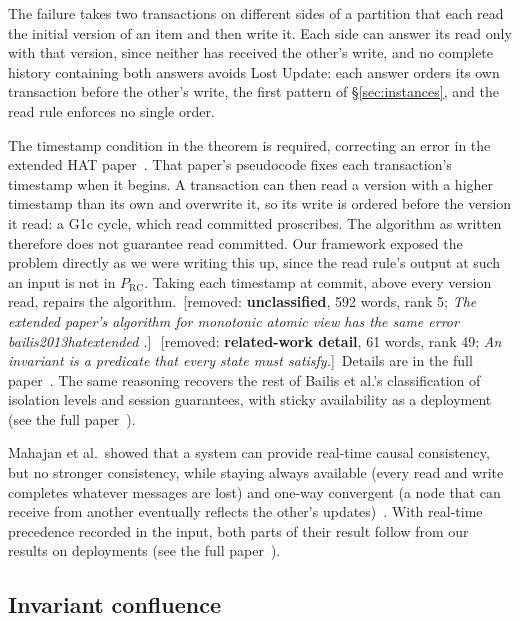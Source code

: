 \documentclass[sigconf]{cidr-2027}
\theoremstyle{remark}
\newcommand{\extended}{the full paper~\cite{hellerstein2026completecalmfull}}
\newcommand{\removednote}[1]{{\color{cutred}\footnotesize\,[removed: #1]\,}}
\begin{document}
\textcolor{newblue}{The failure takes two transactions on different sides of a partition that
each read the initial version of an item and then write it.} \textcolor{newblue}{Each side can
answer its read only with that version, since neither has received the
other's write, and no complete history containing both answers avoids Lost
Update: each answer orders its own transaction before the other's write, the
first pattern of \S\ref{sec:instances}, and the read rule enforces no single
order.}

The timestamp condition in the theorem is required, correcting an error in
the extended HAT paper~\cite{bailis2013hatextended}. That paper's pseudocode
fixes each transaction's timestamp when it begins. A transaction can then read
a version with a higher timestamp than its own and overwrite it, so its write
is ordered before the version it read: a G1c cycle, which read committed
proscribes. The algorithm as written therefore does not guarantee read
committed. Our framework exposed the problem directly as we were writing this
up, since the read rule's output at such an input is not in $P_{\mathrm{RC}}$. Taking each timestamp at commit, above every version read, repairs the
algorithm. \removednote{\textbf{unclassified}, 592 words, rank 5; \textit{The extended paper's algorithm for monotonic atomic view has the same error bailis2013hatextended .}} \removednote{\textbf{related-work detail}, 61 words, rank 49; \textit{An invariant is a predicate that every state must satisfy.}} \textcolor{newblue}{Details are in \extended.} \textcolor{newblue}{The same reasoning recovers the rest of
Bailis et al.'s classification of isolation levels and session guarantees, with
sticky availability as a deployment (see \extended).}

\textcolor{newblue}{Mahajan et al.\ showed that a system can provide real-time causal consistency,
but no stronger consistency, while staying always available (every read and
write completes whatever messages are lost) and one-way convergent (a node that
can receive from another eventually reflects the other's
updates)~\cite{mahajan2011consistency}.} \textcolor{newblue}{With real-time precedence recorded in
the input, both parts of their result follow from our results on deployments (see \extended).}

\subsection{Invariant confluence}
\label{sec:iconfluence-instance}
\end{document}
